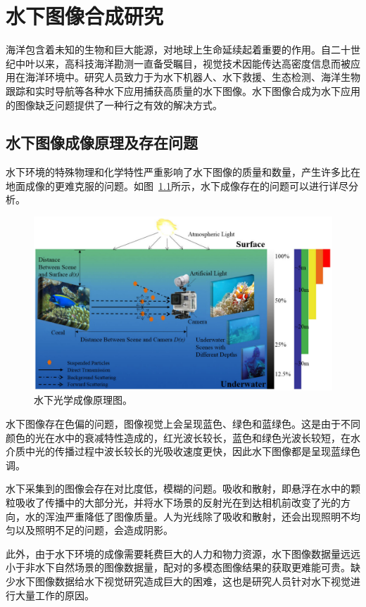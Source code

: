 \chapter{水下图像合成研究}
海洋包含着未知的生物和巨大能源，对地球上生命延续起着重要的作用。自二十世纪中叶以来，高科技海洋勘测一直备受瞩目，视觉技术因能传达高密度信息而被应用在海洋环境中。研究人员致力于为水下机器人、水下救援、生态检测、海洋生物跟踪和实时导航等各种水下应用捕获高质量的水下图像。水下图像合成为水下应用的图像缺乏问题提供了一种行之有效的解决方式。

\section{水下图像成像原理及存在问题}
水下环境的特殊物理和化学特性严重影响了水下图像的质量和数量，产生许多比在地面成像的更难克服的问题。如图~\ref{fig:underwater}所示，水下成像存在的问题可以进行详尽分析。

\begin{figure}[ht]
    \centering
	\includegraphics[width=\textwidth]{figs/水下成像.pdf}
	\caption{水下光学成像原理图。}
	\label{fig:underwater}
\end{figure}

水下图像存在色偏的问题，图像视觉上会呈现蓝色、绿色和蓝绿色。这是由于不同颜色的光在水中的衰减特性造成的，红光波长较长，蓝色和绿色光波长较短，在水介质中光的传播过程中波长较长的光吸收速度更快，因此水下图像都是呈现蓝绿色调。

水下采集到的图像会存在对比度低，模糊的问题。吸收和散射，即悬浮在水中的颗粒吸收了传播中的大部分光，并将水下场景的反射光在到达相机前改变了光的方向，水的浑浊严重降低了图像质量。人为光线除了吸收和散射，还会出现照明不均匀以及照明不足的问题，会造成阴影。


此外，由于水下环境的成像需要耗费巨大的人力和物力资源，水下图像数据量远远小于非水下自然场景的图像数据量，配对的多模态图像结果的获取更难能可贵。缺少水下图像数据给水下视觉研究造成巨大的困难，这也是研究人员针对水下视觉进行大量工作的原因。

